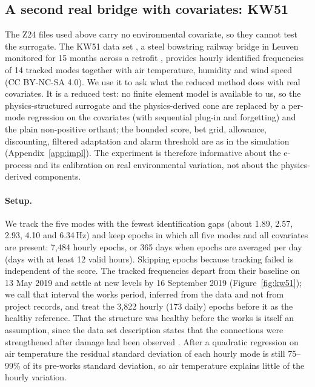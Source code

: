 \documentclass[12pt,a4paper]{article}
\newenvironment{revblock}{}{}
\newenvironment{revblock}{\begingroup\color{revcol}}{\endgroup}
\begin{document}
\begin{revblock}
\subsection{A second real bridge with covariates: KW51}\label{sec:kw51}

The Z24 files used above carry no environmental covariate, so they cannot test the surrogate. The KW51 data set \citep{maes2020kw51data}, a steel bowstring railway bridge in Leuven monitored for 15 months across a retrofit \citep{maes2022kw51}, provides hourly identified frequencies of 14 tracked modes together with air temperature, humidity and wind speed (CC BY-NC-SA 4.0). We use it to ask what the reduced method does with real covariates. It is a reduced test: no finite element model is available to us, so the physics-structured surrogate and the physics-derived cone are replaced by a per-mode regression on the covariates (with sequential plug-in and forgetting) and the plain non-positive orthant; the bounded score, bet grid, allowance, discounting, filtered adaptation and alarm threshold are as in the simulation (Appendix~\ref{app:impl}). The experiment is therefore informative about the e-process and its calibration on real environmental variation, not about the physics-derived components.

\paragraph{Setup.} We track the five modes with the fewest identification gaps (about 1.89, 2.57, 2.93, 4.10 and 6.34\,Hz) and keep epochs in which all five modes and all covariates are present: 7{,}484 hourly epochs, or 365 days when epochs are averaged per day (days with at least 12 valid hours). Skipping epochs because tracking failed is independent of the score. The tracked frequencies depart from their baseline on 13 May 2019 and settle at new levels by 16 September 2019 (Figure~\ref{fig:kw51}); we call that interval the works period, inferred from the data and not from project records, and treat the 3{,}822 hourly (173 daily) epochs before it as the healthy reference. That the structure was healthy before the works is itself an assumption, since the data set description states that the connections were strengthened after damage had been observed \citep{maes2020kw51data}. After a quadratic regression on air temperature the residual standard deviation of each hourly mode is still 75--99\% of its pre-works standard deviation, so air temperature explains little of the hourly variation.


\end{revblock}
\end{document}
